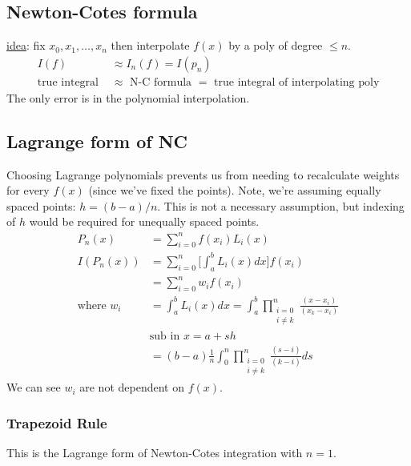 \documentclass[12pt]{article}
\begin{document}
 
\subsection*{Newton-Cotes formula}
 
\underline{idea}: fix $x_0, x_1, \dots, x_n$ then interpolate $f(x)$ by a poly of degree $\leq n$.
%
\begin{align*}
I(f) &\approx I_n(f) = I(p_n)\\
\text{true integral } &\approx \text{ N-C formula } = \text{ true integral of interpolating poly}
\end{align*}
%
The only error is in the polynomial interpolation.

\subsection*{Lagrange form of NC}
Choosing Lagrange polynomials prevents us from needing to recalculate weights for every $f(x)$ (since we've fixed the points). Note, we're assuming equally spaced points: $h = (b-a)/n$. This is not a necessary assumption, but indexing of $h$ would be required for unequally spaced points.
%
\begin{align*}
P_n(x) &= \sum_{i=0}^{n}f(x_i)L_i(x) \\
%
I(P_n(x)) &= \sum_{i=0}^{n} \bigl[ \int_a^b L_i(x)dx \bigr] f(x_i) \\
%
&= \sum_{i=0}^{n} w_i f(x_i)\\
\text{where } w_i &=  \int_a^b L_i(x)dx = \int_a^b \prod_{\substack{i=0\\ i \neq k}}^n \frac{(x-x_i)}{(x_k-x_i)} \\
&\text{sub in } x = a + sh\\
&=  (b-a)\frac{1}{n}\int_0^n \prod_{\substack{i=0\\ i \neq k}}^n \frac{(s-i)}{(k-i)}ds
\end{align*}
We can see $w_i$ are not dependent on $f(x)$.

\subsubsection*{Trapezoid Rule}
This is the Lagrange form of Newton-Cotes integration with $n=1$.
\end{document}
